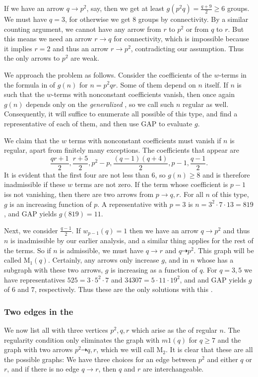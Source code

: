 \documentclass[draft]{article}
\newcommand{\m}[1]{\text{M}_{#1}}
\theoremstyle{plain}
\theoremstyle{definition}
\begin{document}
If we have an arrow $q \rightarrow p^2$, say, then we get at least $g(p^2 q) = \frac{q + 9}{2} \ge 6$ groups. We must have $q = 3$, for otherwise we get 8 groups by connectivity. By a similar counting argument, we cannot have any arrow from $r$ to $p^2$ or from $q$ to $r$. But this means we need an arrow $r \rightarrow q$ for connectivity, which is impossible because it implies $r = 2$ and thus an arrow $r \rightarrow p^2$, contradicting our assumption. Thus the only arrows to $p^2$ are weak.

We approach the problem as follows. Consider the coefficients of the $w$-terms in the formula in  of $g(n)$ for $n = p^2 q r$. Some of them depend on $n$ itself. If $n$ is such that the $w$-terms with nonconstant coefficients vanish, then once again $g(n)$ depends only on the \emph{generalized} \hg, so we call such $n$ regular as well. Consequently, it will suffice to enumerate all possible \ghgs of this type, and find a representative of each of them, and then use GAP to evaluate $g$. 

We claim that the $w$ terms with nonconstant coefficients must vanish if $n$ is regular, apart from finitely many exceptions. The coefficients that appear are \[\frac{qr + 1}{2}, \frac{r + 5}{2}, p^2 - p, \frac{(q - 1)(q + 4)}{2}, p - 1, \frac{q - 1}{2}.\] It is evident that the first four are not less than $6$, so $g(n) \ge 8$ and is therefore inadmissible if these $w$ terms are not zero. If the term whose  coefficient is $p - 1$ iss not vanishing, then there are two arrows from $p \rightarrow q, r$. For all $n$ of this type, $g$ is an increasing function of $p$. A representative with $p = 3$ is $n = 3^2 \cdot 7 \cdot 13 = 819$, and GAP yields $g(819) = 11$.

Next, we consider $\frac{q - 1}{2}$.  If $w_{p - 1}(q) = 1$ then we have an arrow $q \rightarrow p^2$ and thus $n$ is inadmissible by our earlier analysis, and a similar thing applies for the rest of the terms. So if $n$ is admissible, we must have $q \rightarrow r$ and $q \dashrightarrow p^2$. This graph will be called $\m{1}(q)$. Certainly, any arrows only increase $g$, and in $n$ whose \ghg has a subgraph with these two arrows, $g$ is increasing as a function of $q$. For $q = 3, 5$ we have representatives $525 = 3 \cdot 5^2 \cdot 7$ and $34307 = 5 \cdot 11 \cdot 19^2$, and and GAP yields $g$ of $6$ and $7$, respectively. Thus these are the only solutions with this \hg.


\subsubsection*{Two edges in the \hg}
We now list all \ghg with three vertices $p^2, q, r$ which arise as the \ghgs of regular $n$. The regularity condition only eliminates the graph with $m1(q)$ for $q \ge 7$ and the graph with two arrows $p^2 \dashrightarrow q, r$, which we will call $\m2$. It is clear that these are all the possible graphs: We have three choices for an edge between $p^2$ and either $q$ or $r$, and if there is no edge $q \rightarrow r$, then $q$ and $r$ are interchangeable.
\end{document}
